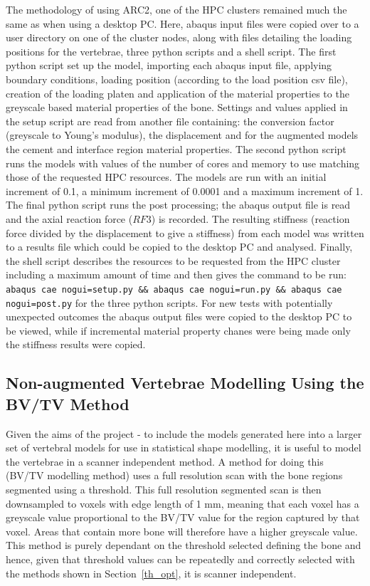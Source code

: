 The methodology of using ARC2, one of the HPC clusters remained much the same
as when using a desktop PC. Here, abaqus input files were copied over to a user
directory on one of the cluster nodes, along with files detailing the loading
positions for the vertebrae, three python scripts and a shell script. The first
python script set up the model, importing each abaqus input file, applying
boundary conditions, loading position (according to the load position csv
file), creation of the  loading platen and application of the material
properties to the greyscale based material properties of the bone. Settings and
values applied in the setup script are read from another file containing: the
conversion factor (greyscale to Young's modulus), the displacement and for the augmented models the cement and
interface region material properties. The second python script runs the models
with values of the number of cores and memory to use matching those of the
requested HPC resources. The models are run with an initial increment of 0.1, a
minimum increment of 0.0001 and a maximum increment of 1. The final python
script runs the post processing; the abaqus output file is read and the axial
reaction force ($RF3$) is recorded. The resulting stiffness (reaction force divided by the
displacement to give a stiffness) from each model was written to a results file
which could be copied to the desktop PC and analysed. Finally, the shell script
describes the resources to be requested from the HPC cluster including a
maximum amount of time and then gives the command to be run: \texttt{abaqus cae
nogui=setup.py \&\& abaqus cae nogui=run.py \&\& abaqus cae nogui=post.py} for
the three python scripts. For
new
tests with potentially unexpected outcomes the abaqus output files were copied
to the desktop PC to be viewed, while if incremental material property chanes
were being made only the stiffness results were copied.


\subsection{Non-augmented Vertebrae Modelling Using the BV/TV Method}\label{sec:non_aug_sens}



Given the aims of the project - to include the models generated here into a
larger set of vertebral models for use in statistical shape modelling, it is
useful to model the vertebrae in a scanner independent method. A method for
doing this (BV/TV modelling method) uses a full resolution scan with the bone
regions segmented using a threshold. This full resolution segmented scan is
then
downsampled to voxels with edge length of 1 mm, meaning that each voxel has a
greyscale value proportional to the BV/TV value for the region captured by that
voxel. Areas that contain more bone will therefore have a higher greyscale
value. This method is purely dependant on the threshold selected defining the
bone and hence, given that threshold values can be repeatedly and correctly
selected with the methods shown in Section~\ref{th_opt}, it is scanner
independent.

